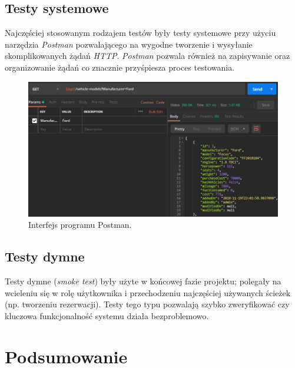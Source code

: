 \documentclass[eng,printmode,openany]{mgr}
\begin{document}
	
	
	\section{Testy systemowe}
	Najczęściej stosowanym rodzajem testów były testy systemowe przy użyciu narzędzia \textit{Postman} pozwalającego na wygodne tworzenie i wysyłanie skomplikowanych żądań \textit{HTTP}. \textit{Postman} pozwala również na zapisywanie oraz organizowanie żądań co znacznie przyśpiesza proces testowania.
	\begin{figure}[H]
		\centering
		\includegraphics[width=\textwidth]{images/tests_postman.png}
		\caption{Interfejs programu Postman.}
	\end{figure}
	\section{Testy dymne}
	Testy dymne (\textit{smoke test}) były użyte w końcowej fazie projektu; polegały na wcieleniu się w rolę użytkownika i przechodzeniu najczęściej używanych ścieżek (np. tworzeniu rezerwacji). Testy tego typu pozwalają szybko zweryfikować czy kluczowa funkcjonalność systemu działa bezproblemowo.
	
	\newpage
	\chapter{Podsumowanie}
\end{document}
